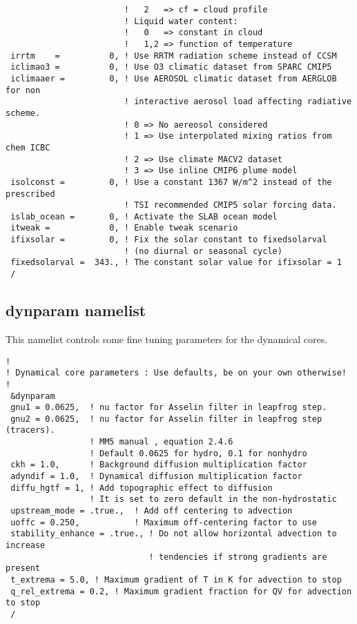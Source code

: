 {\begin{Verbatim}
                        !   2   => cf = cloud profile
                        ! Liquid water content:
                        !   0   => constant in cloud
                        !   1,2 => function of temperature
 irrtm    =          0, ! Use RRTM radiation scheme instead of CCSM
 iclimao3 =          0, ! Use O3 climatic dataset from SPARC CMIP5
 iclimaaer =         0, ! Use AEROSOL climatic dataset from AERGLOB for non
                        ! interactive aerosol load affecting radiative scheme.
                        ! 0 => No aereosol considered
                        ! 1 => Use interpolated mixing ratios from chem ICBC
                        ! 2 => Use climate MACV2 dataset
                        ! 3 => Use inline CMIP6 plume model
 isolconst =         0, ! Use a constant 1367 W/m^2 instead of the prescribed
                        ! TSI recommended CMIP5 solar forcing data.
 islab_ocean =       0, ! Activate the SLAB ocean model
 itweak =            0, ! Enable tweak scenario
 ifixsolar =         0, ! Fix the solar constant to fixedsolarval
                        ! (no diurnal or seasonal cycle)
 fixedsolarval =  343., ! The constant solar value for ifixsolar = 1
 /
\end{Verbatim}
}

\subsection{dynparam namelist}
\label{dynparam}

This namelist controls some fine tuning parameters for the dynamical cores.

{\footnotesize
\begin{Verbatim}
!
! Dynamical core parameters : Use defaults, be on your own otherwise!
!
 &dynparam
 gnu1 = 0.0625,  ! nu factor for Asselin filter in leapfrog step.
 gnu2 = 0.0625,  ! nu factor for Asselin filter in leapfrog step (tracers).
                 ! MM5 manual , equation 2.4.6
                 ! Default 0.0625 for hydro, 0.1 for nonhydro
 ckh = 1.0,      ! Background diffusion multiplication factor
 adyndif = 1.0,  ! Dynamical diffusion multiplication factor
 diffu_hgtf = 1, ! Add topographic effect to diffusion
                 ! It is set to zero default in the non-hydrostatic
 upstream_mode = .true.,  ! Add off centering to advection
 uoffc = 0.250,           ! Maximum off-centering factor to use
 stability_enhance = .true., ! Do not allow horizontal advection to increase
                             ! tendencies if strong gradients are present
 t_extrema = 5.0, ! Maximum gradient of T in K for advection to stop
 q_rel_extrema = 0.2, ! Maximum gradient fraction for QV for advection to stop
 /
\end{Verbatim}
}


